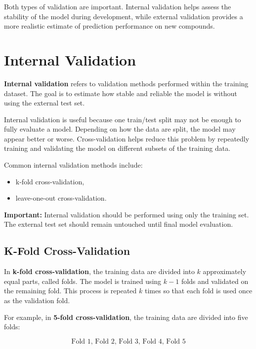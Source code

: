 \documentclass[11pt]{report}
\newenvironment{Important note}{\begin{quote}\color{red}\textbf{Important note:} }{\end{quote}}
\begin{document}
Both types of validation are important. Internal validation helps assess the stability of the model during development, while external validation provides a more realistic estimate of prediction performance on new compounds.

\section{Internal Validation}

\textbf{Internal validation} refers to validation methods performed within the training dataset. The goal is to estimate how stable and reliable the model is without using the external test set.

Internal validation is useful because one train/test split may not be enough to fully evaluate a model. Depending on how the data are split, the model may appear better or worse. Cross-validation helps reduce this problem by repeatedly training and validating the model on different subsets of the training data.

Common internal validation methods include:

\begin{itemize}[leftmargin=*]
    \item k-fold cross-validation,
    \item leave-one-out cross-validation.
\end{itemize}

\textbf{Important:} Internal validation should be performed using only the training set. The external test set should remain untouched until final model evaluation.

\subsection{K-Fold Cross-Validation}

In \textbf{k-fold cross-validation}, the training data are divided into $k$ approximately equal parts, called folds. The model is trained using $k-1$ folds and validated on the remaining fold. This process is repeated $k$ times so that each fold is used once as the validation fold.

For example, in \textbf{5-fold cross-validation}, the training data are divided into five folds:

\[
\text{Fold 1, Fold 2, Fold 3, Fold 4, Fold 5}
\]
\end{document}
